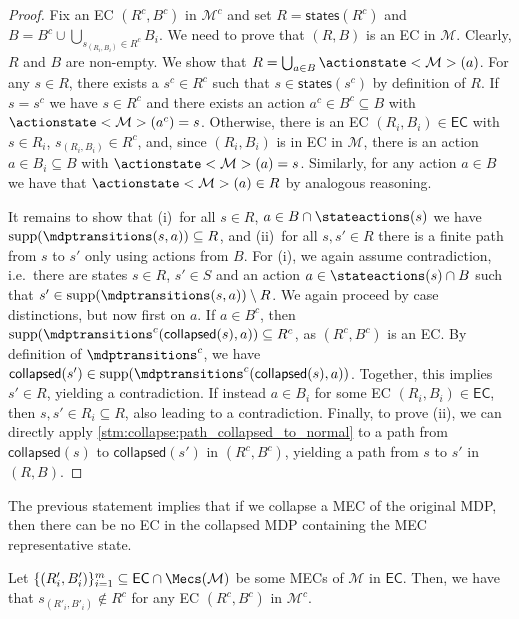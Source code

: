 \documentclass{theoretics}
\newcommand{\unionSym}{\cup}
\newcommand{\unionBin}{\mathbin{\unionSym}}
\newcommand{\intersectionSym}{\cap}
\newcommand{\intersectionBin}{\mathbin{\intersectionSym}}
\newcommand{\UnionSym}{\bigcup}
\newcommand{\union}{\unionBin}
\newcommand{\intersection}{\intersectionBin}
\newcommand{\Union}{\UnionSym}
\newcommand{\MDP}{\mathcal{M}}
\newcommand{\States}{S}
\DeclareMathOperator{\support}{supp}
\newcommand{\eccollapsed}{\mathsf{collapsed}}
\newcommand{\ecstates}{\mathsf{states}}
\newcommand{\algoecs}{\mathsf{EC}}
\begin{document}
\begin{proof}
	Fix an EC $(R^c, B^c)$ in $\MDP^c$ and set $R = \ecstates(R^c)$ and $B = B^c \union \Union_{s_{(R_i, B_i)} \in R^c} B_i$.
	We need to prove that $(R, B)$ is an EC in $\MDP$.
	Clearly, $R$ and $B$ are non-empty.
	We show that $R = \Union_{a \in B} \actionstate<\MDP>(a)$.
	For any $s \in R$, there exists a $s^c \in R^c$ such that $s \in \ecstates(s^c)$ by definition of $R$.
	If $s = s^c$ we have $s \in R^c$ and there exists an action $a^c \in B^c \subseteq B$ with $\actionstate<\MDP>(a^c) = s$.
	Otherwise, there is an EC $(R_i, B_i) \in \algoecs$ with $s \in R_i$, $s_{(R_i, B_i)} \in R^c$, and, since $(R_i, B_i)$ is in EC in $\MDP$, there is an action $a \in B_i \subseteq B$ with $\actionstate<\MDP>(a) = s$.
	Similarly, for any action $a \in B$ we have that $\actionstate<\MDP>(a) \in R$ by analogous reasoning.

	It remains to show that (i)~for all $s \in R$, $a \in B \intersection \stateactions(s)$ we have $\support(\mdptransitions(s, a)) \subseteq R$, and (ii)~for all $s, s' \in R$ there is a finite path from $s$ to $s'$ only using actions from $B$.
	For (i), we again assume contradiction, i.e.\ there are states $s \in R$, $s' \in \States$ and an action $a \in \stateactions(s) \intersection B$ such that $s' \in \support(\mdptransitions(s, a)) \setminus R$.
	We again proceed by case distinctions, but now first on $a$.
	If $a \in B^c$, then $\support(\mdptransitions^c(\eccollapsed(s), a)) \subseteq R^c$, as $(R^c, B^c)$ is an EC.
	By definition of $\mdptransitions^c$, we have $\eccollapsed(s') \in \support(\mdptransitions^c(\eccollapsed(s), a))$.
	Together, this implies $s' \in R$, yielding a contradiction.
	If instead $a \in B_i$ for some EC $(R_i, B_i) \in \algoecs$, then $s, s' \in R_i \subseteq R$, also leading to a contradiction.
	Finally, to prove (ii), we can directly apply \cref{stm:collapse:path_collapsed_to_normal} to a path from $\eccollapsed(s)$ to $\eccollapsed(s')$ in $(R^c, B^c)$, yielding a path from $s$ to $s'$ in $(R, B)$. 
\end{proof}
The previous statement implies that if we collapse a MEC of the original MDP, then there can be no EC in the collapsed MDP containing the MEC representative state.
\begin{lemma} \label{stm:collapse:no_ecs}
	Let $\{(R'_i, B'_i)\}_{i=1}^m \subseteq \algoecs \intersection \Mecs(\MDP)$ be some MECs of $\MDP$ in $\algoecs$.
	Then, we have that $s_{(R'_i, B'_i)} \notin R^c$ for any EC $(R^c, B^c)$ in $\MDP^c$.
\end{lemma}
\end{document}

